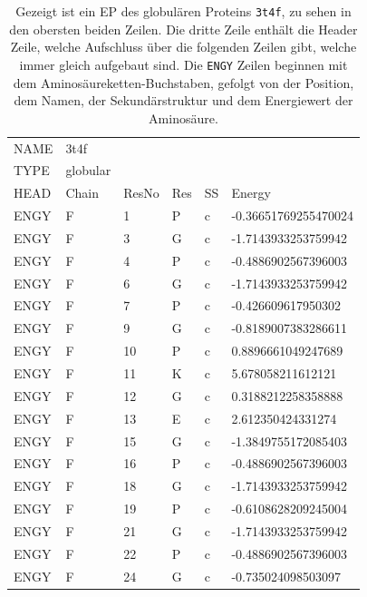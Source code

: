 \begin{table}[H]
    \centering
    \caption{Gezeigt ist ein \acf{EP} des globulären Proteins \texttt{3t4f}, zu sehen in den obersten beiden Zeilen. Die dritte Zeile enthält die Header Zeile, welche Aufschluss über die folgenden Zeilen gibt, welche immer gleich aufgebaut sind. Die \texttt{ENGY} Zeilen beginnen mit dem Aminosäureketten-Buchstaben, gefolgt von der Position, dem Namen, der Sekundärstruktur und dem Energiewert der Aminosäure.}
    \label{tab:EP}
    \begin{tabular}{llllll}
    NAME & 3t4f &  &  &  &  \\
    TYPE & globular &  &  &  &  \\
    HEAD & Chain & ResNo & Res & SS & Energy \\
    ENGY & F & 1 & P & c & -0.36651769255470024 \\
    ENGY & F & 3 & G & c & -1.7143933253759942 \\
    ENGY & F & 4 & P & c & -0.4886902567396003 \\
    ENGY & F & 6 & G & c & -1.7143933253759942 \\
    ENGY & F & 7 & P & c & -0.426609617950302 \\
    ENGY & F & 9 & G & c & -0.8189007383286611 \\
    ENGY & F & 10 & P & c & 0.8896661049247689 \\
    ENGY & F & 11 & K & c & 5.678058211612121 \\
    ENGY & F & 12 & G & c & 0.3188212258358888 \\
    ENGY & F & 13 & E & c & 2.612350424331274 \\
    ENGY & F & 15 & G & c & -1.3849755172085403 \\
    ENGY & F & 16 & P & c & -0.4886902567396003 \\
    ENGY & F & 18 & G & c & -1.7143933253759942 \\
    ENGY & F & 19 & P & c & -0.6108628209245004 \\
    ENGY & F & 21 & G & c & -1.7143933253759942 \\
    ENGY & F & 22 & P & c & -0.4886902567396003 \\
    ENGY & F & 24 & G & c & -0.735024098503097
    \end{tabular}
\end{table}

